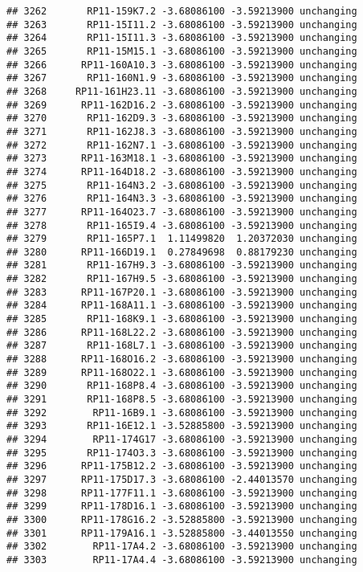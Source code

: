 \documentclass[]{article}
\begin{document}
\begin{verbatim}
## 3262       RP11-159K7.2 -3.68086100 -3.59213900 unchanging
## 3263       RP11-15I11.2 -3.68086100 -3.59213900 unchanging
## 3264       RP11-15I11.3 -3.68086100 -3.59213900 unchanging
## 3265       RP11-15M15.1 -3.68086100 -3.59213900 unchanging
## 3266      RP11-160A10.3 -3.68086100 -3.59213900 unchanging
## 3267       RP11-160N1.9 -3.68086100 -3.59213900 unchanging
## 3268     RP11-161H23.11 -3.68086100 -3.59213900 unchanging
## 3269      RP11-162D16.2 -3.68086100 -3.59213900 unchanging
## 3270       RP11-162D9.3 -3.68086100 -3.59213900 unchanging
## 3271       RP11-162J8.3 -3.68086100 -3.59213900 unchanging
## 3272       RP11-162N7.1 -3.68086100 -3.59213900 unchanging
## 3273      RP11-163M18.1 -3.68086100 -3.59213900 unchanging
## 3274      RP11-164D18.2 -3.68086100 -3.59213900 unchanging
## 3275       RP11-164N3.2 -3.68086100 -3.59213900 unchanging
## 3276       RP11-164N3.3 -3.68086100 -3.59213900 unchanging
## 3277      RP11-164O23.7 -3.68086100 -3.59213900 unchanging
## 3278       RP11-165I9.4 -3.68086100 -3.59213900 unchanging
## 3279       RP11-165P7.1  1.11499820  1.20372030 unchanging
## 3280      RP11-166D19.1  0.27849698  0.88179230 unchanging
## 3281       RP11-167H9.3 -3.68086100 -3.59213900 unchanging
## 3282       RP11-167H9.5 -3.68086100 -3.59213900 unchanging
## 3283      RP11-167P20.1 -3.68086100 -3.59213900 unchanging
## 3284      RP11-168A11.1 -3.68086100 -3.59213900 unchanging
## 3285       RP11-168K9.1 -3.68086100 -3.59213900 unchanging
## 3286      RP11-168L22.2 -3.68086100 -3.59213900 unchanging
## 3287       RP11-168L7.1 -3.68086100 -3.59213900 unchanging
## 3288      RP11-168O16.2 -3.68086100 -3.59213900 unchanging
## 3289      RP11-168O22.1 -3.68086100 -3.59213900 unchanging
## 3290       RP11-168P8.4 -3.68086100 -3.59213900 unchanging
## 3291       RP11-168P8.5 -3.68086100 -3.59213900 unchanging
## 3292        RP11-16B9.1 -3.68086100 -3.59213900 unchanging
## 3293       RP11-16E12.1 -3.52885800 -3.59213900 unchanging
## 3294        RP11-174G17 -3.68086100 -3.59213900 unchanging
## 3295       RP11-174O3.3 -3.68086100 -3.59213900 unchanging
## 3296      RP11-175B12.2 -3.68086100 -3.59213900 unchanging
## 3297      RP11-175D17.3 -3.68086100 -2.44013570 unchanging
## 3298      RP11-177F11.1 -3.68086100 -3.59213900 unchanging
## 3299      RP11-178D16.1 -3.68086100 -3.59213900 unchanging
## 3300      RP11-178G16.2 -3.52885800 -3.59213900 unchanging
## 3301      RP11-179A16.1 -3.52885800 -3.44013550 unchanging
## 3302        RP11-17A4.2 -3.68086100 -3.59213900 unchanging
## 3303        RP11-17A4.4 -3.68086100 -3.59213900 unchanging

\end{verbatim}
\end{document}
